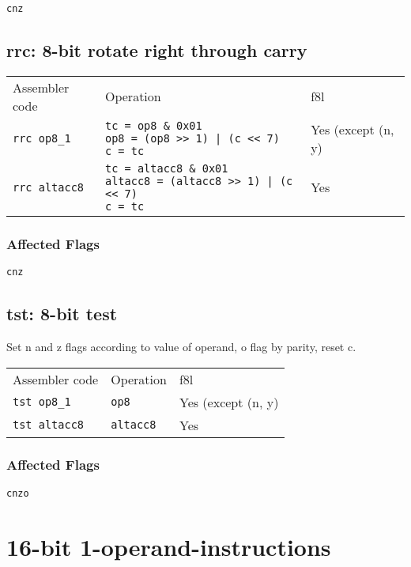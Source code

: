 \documentclass{book}
\begin{document}
\texttt{cnz}


\subsection{rrc: 8-bit rotate right through carry}

\begin{tabular}{l l l}
Assembler code       & Operation                                                                                               & f8l \\
\texttt{rrc op8\_1}  & \makecell{\texttt{tc = op8  \& 0x01}\\\texttt{op8 = (op8 >> 1) | (c << 7)}\\\texttt{c = tc}}            & Yes (except (n, y) \\
\texttt{rrc altacc8} & \makecell{\texttt{tc = altacc8 \& 0x01}\\\texttt{altacc8 = (altacc8 >> 1) | (c << 7)}\\\texttt{c = tc}} & Yes
\end{tabular}

\subsubsection*{Affected Flags}

\texttt{cnz}


\subsection{tst: 8-bit test}

Set n and z flags according to value of operand, o flag by parity, reset c.

\begin{tabular}{l l l}
Assembler code       & Operation        & f8l \\
\texttt{tst op8\_1}  & \texttt{op8}     & Yes (except (n, y) \\
\texttt{tst altacc8} & \texttt{altacc8} & Yes
\end{tabular}

\subsubsection*{Affected Flags}

\texttt{cnzo}


\section{16-bit 1-operand-instructions}
\end{document}
